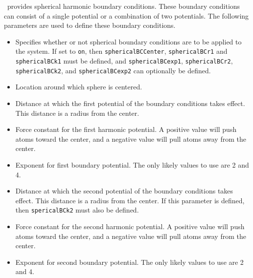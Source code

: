 \NAMD\ provides spherical harmonic boundary conditions.  These 
boundary conditions can consist of a single potential or a 
combination of two potentials.
The following parameters are used to define these boundary conditions.  

\begin{itemize}

\item
{}
{Specifies whether or not spherical boundary conditions 
are to be applied to the system.  If 
set to {\tt on}, then {\tt sphericalBCCenter}, {\tt sphericalBCr1} and {\tt sphericalBCk1} 
must be defined, and {\tt sphericalBCexp1}, {\tt sphericalBCr2}, 
{\tt sphericalBCk2}, and {\tt sphericalBCexp2} can optionally be 
defined.}

\item
{}
{Location around which sphere is centered.}

\item
{}
{Distance at which the first potential of the boundary conditions takes
effect.  This distance is a radius from the center.}

\item
{}
{Force constant for the first harmonic potential.  A positive
value will push atoms toward the center, and a negative
value will pull atoms away from the center.}

\item
{}
{Exponent for first boundary potential.  The only likely values to
use are 2 and 4.}

\item
{}
{Distance at which the second potential of the boundary conditions takes
effect.  This distance is a radius from the center.
If this parameter is defined, then {\tt spericalBCk2} must also
be defined.}

\item
{}
{Force constant for the second harmonic potential.  A positive
value will push atoms toward the center, and a negative
value will pull atoms away from the center.}

\item
{}
{Exponent for second boundary potential.  The only likely values to
use are 2 and 4.}

\end{itemize}

